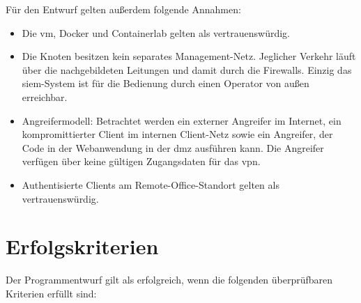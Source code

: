 Für den Entwurf gelten außerdem folgende Annahmen:

\begin{itemize}
	\item Die \acs{vm}, Docker und Containerlab gelten als vertrauenswürdig.
	\item Die Knoten besitzen kein separates Management-Netz. Jeglicher Verkehr läuft über die nachgebildeten Leitungen und damit durch die Firewalls. Einzig das \acs{siem}-System ist für die Bedienung durch einen Operator von außen erreichbar.
	\item Angreifermodell: Betrachtet werden ein externer Angreifer im Internet, ein kompromittierter Client im internen Client-Netz sowie ein Angreifer, der Code in der Webanwendung in der \acs{dmz} ausführen kann. Die Angreifer verfügen über keine gültigen Zugangsdaten für das \acs{vpn}.
	\item Authentisierte Clients am Remote-Office-Standort gelten als vertrauenswürdig.
\end{itemize}

\section{Erfolgskriterien}\label{sec:erfolgskriterien}

Der Programmentwurf gilt als erfolgreich, wenn die folgenden überprüfbaren Kriterien erfüllt sind:

